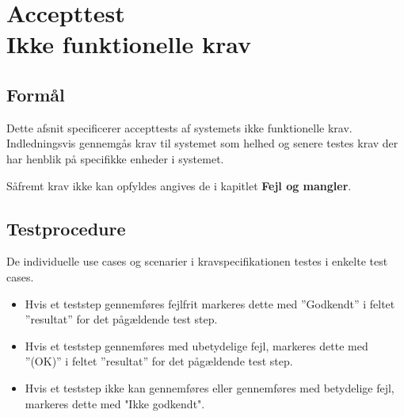 \chapter{Accepttest \\ Ikke funktionelle krav}

\section*{Formål}
\vspace{-0.5cm}
Dette afsnit specificerer accepttests af systemets ikke funktionelle krav. Indledningsvis gennemgås krav til systemet som helhed og senere testes krav der har henblik på specifikke enheder i systemet. 

Såfremt krav ikke kan opfyldes angives de i kapitlet \textbf{Fejl og mangler}.

\section*{Testprocedure}
\vspace{-0.5cm}
De individuelle use cases og scenarier i kravspecifikationen testes i enkelte test cases. 

\begin{itemize}
	\item Hvis et teststep gennemføres fejlfrit markeres dette med ”Godkendt” i feltet ”resultat” for det pågældende test step.

	\item Hvis et teststep gennemføres med ubetydelige fejl, markeres dette med ”(OK)” i feltet ”resultat” for det pågældende test step.
	
	\item Hvis et teststep ikke kan gennemføres eller gennemføres med betydelige fejl, markeres dette med "Ikke godkendt".
	
\end{itemize}

\vspace{1.5cm}


